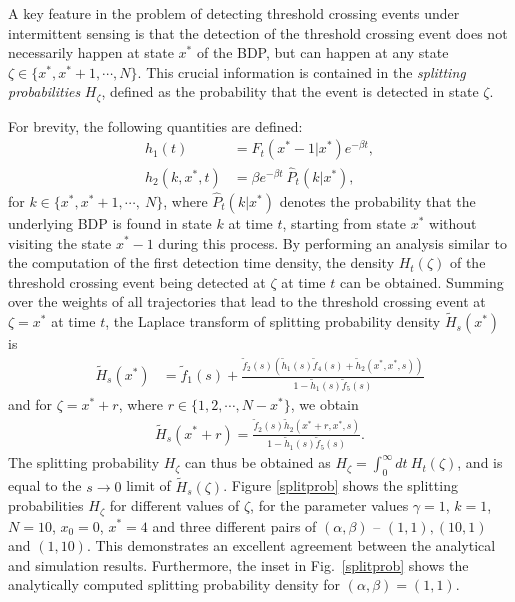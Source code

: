 A key feature in the problem of detecting threshold crossing events under intermittent sensing is that the detection of the threshold crossing event does not necessarily happen at state $x^*$ of the BDP, but can happen at any state $\zeta\in\{x^*, x^*+1, \cdots, N \}$. This crucial information is contained in the \emph{splitting probabilities} $H_\zeta$, defined as the probability that the event is detected in state $\zeta$. 

For brevity, the following quantities are defined:
\begin{align}
  h_{1}(t) &= F_t(x^*-1|x^*) e^{-\beta t}, \\ h_{2}(k,x^*, t) &= \beta e^{-\beta t}~\hat{P}_{t}(k|x^*), 
\end{align}
for $k \in \{x^*,x^*+1,\cdots,~N\}$, where $\hat{P}_{t}(k|x^*)$ denotes the probability that the underlying BDP is found in state $k$ at time $t$, starting from state $x^*$ without visiting the state $x^*-1$ during this process. By performing an analysis similar to the computation of the first detection time density, the density $H_t(\zeta)$ of the threshold crossing event being detected at $\zeta$ at time $t$ can be obtained. Summing over the weights of all trajectories that lead to the threshold crossing event at $\zeta=x^*$ at time $t$, the Laplace transform of splitting probability density $\widetilde{H}_{s}(x^*)$ is
\begin{align}
    \widetilde{H}_{s}(x^*) &= \widetilde{f}_{1}(s) + \frac{\widetilde{f}_{2}(s) \left( \widetilde{h}_{1}(s) \widetilde{f}_{4}(s)+  \widetilde{h}_{2}(x^*,x^*, s)\right) }{1- \widetilde{h}_{1}(s) \widetilde{f}_{5}(s)}
\end{align}
and for $\zeta= x^*+r$, where $r\in \{1,2,\cdots,N-x^*\}$, we obtain
\begin{align}
  \widetilde{H}_{s}(x^*+r) = \frac{\widetilde{f}_{2}(s) \widetilde{h}_{2}(x^*+r,x^*, s)}{1 - \widetilde{h}_{1}(s) \widetilde{f}_{5}(s)}.
\end{align}
The splitting probability $H_\zeta$ can thus be obtained as $H_\zeta = \int_0^\infty dt ~ H_t(\zeta)$, and is equal to the $s\to 0$ limit of $\widetilde{H}_{s}(\zeta)$. Figure \ref{splitprob} shows the splitting
probabilities $H_\zeta$ for different values of $\zeta$, for the parameter values $\gamma=1$, $k=1$, $N=10$, $x_0=0$, $x^*=4$ and three different pairs of $(\alpha,\beta)$ -- $(1,1), (10,1)$ and $(1,10)$. 
This demonstrates an excellent agreement between the analytical and simulation results. Furthermore, the inset in Fig.~\ref{splitprob} shows the analytically computed splitting probability density
for $(\alpha,\beta)=(1,1)$.


